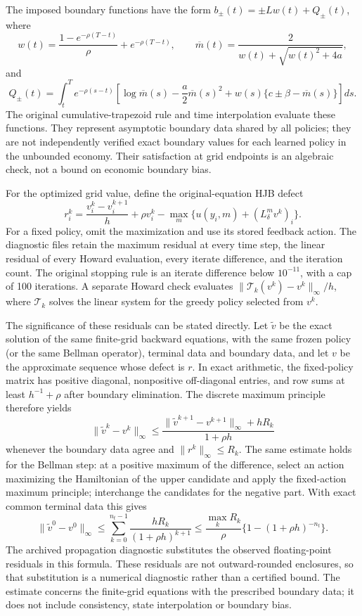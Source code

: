 The imposed boundary functions have the form
$b_\pm(t)=\pm Lw(t)+Q_\pm(t)$, where
\[
 w(t)=\frac{1-e^{-\rho(T-t)}}{\rho}+e^{-\rho(T-t)},\qquad
 \overline m(t)=\frac{2}{w(t)+\sqrt{w(t)^2+4a}},
\]
and
\[
 Q_\pm(t)=\int_t^T e^{-\rho(s-t)}
 \left[\log\overline m(s)-\frac a2\overline m(s)^2
       +w(s)\{c\pm\beta-\overline m(s)\}\right]ds.
\]
The original cumulative-trapezoid rule and time interpolation evaluate these
functions. They represent asymptotic boundary data shared by all policies;
they are not independently verified exact boundary values for each learned
policy in the unbounded economy. Their satisfaction at grid endpoints is
an algebraic check, not a bound on economic boundary bias.

For the optimized grid value, define the original-equation HJB defect
\[
 r_i^k=\frac{v_i^k-v_i^{k+1}}{h}+\rho v_i^k
       -\max_m\{u(y_i,m)+(L^m_\delta v^k)_i\}.
\]
For a fixed policy, omit the maximization and use its stored feedback action.
The diagnostic files retain the maximum residual at every time step, the
linear residual of every Howard evaluation, every iterate difference, and
the iteration count. The original stopping rule is an iterate difference
below $10^{-11}$, with a cap of 100 iterations. A separate Howard check
evaluates $\|\mathcal T_k(v^k)-v^k\|_\infty/h$, where $\mathcal T_k$
solves the linear system for the greedy policy selected from $v^k$.

The significance of these residuals can be stated directly. Let
$\widetilde v$ be the exact solution of the same finite-grid backward
equations, with the same frozen policy (or the same Bellman operator),
terminal data and boundary data, and let $v$ be the approximate sequence
whose defect is $r$. In exact arithmetic, the fixed-policy matrix has
positive diagonal, nonpositive
off-diagonal entries, and row sums at least $h^{-1}+\rho$ after boundary
elimination. The discrete maximum principle therefore yields
\[
 \|\widetilde v^k-v^k\|_\infty
 \le \frac{\|\widetilde v^{k+1}-v^{k+1}\|_\infty+hR_k}{1+\rho h}
\]
whenever the boundary data agree and $\|r^k\|_\infty\le R_k$.
The same estimate holds for the Bellman step: at a positive maximum of the
difference, select an action maximizing the Hamiltonian of the upper
candidate and apply the fixed-action maximum principle; interchange the
candidates for the negative part. With exact common terminal data this gives
\[
 \|\widetilde v^0-v^0\|_\infty
 \le\sum_{k=0}^{n_t-1}\frac{hR_k}{(1+\rho h)^{k+1}}
 \le \frac{\max_k R_k}{\rho}\{1-(1+\rho h)^{-n_t}\}.
\]
The archived propagation diagnostic substitutes the observed floating-point
residuals in this formula. These residuals are not outward-rounded enclosures,
so that substitution is a numerical diagnostic rather than a certified bound.
The estimate concerns the finite-grid equations with the prescribed boundary
data; it does not include consistency, state interpolation or boundary bias.

